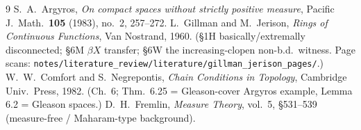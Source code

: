 \documentclass[11pt]{article}
\theoremstyle{definition}
\theoremstyle{remark}
\begin{document}
\begin{thebibliography}{9}
 S.~A.~Argyros, \emph{On compact spaces without strictly
  positive measure}, Pacific J.\ Math.\ \textbf{105} (1983), no.~2, 257--272.
 L.~Gillman and M.~Jerison, \emph{Rings of Continuous Functions},
  Van Nostrand, 1960. (\S1H basically/extremally disconnected; \S6M $\beta X$
  transfer; \S6W the increasing-clopen non-b.d.\ witness. Page scans:
  \texttt{notes/literature\_review/literature/gillman\_jerison\_pages/}.)
 W.~W.~Comfort and S.~Negrepontis, \emph{Chain Conditions in
  Topology}, Cambridge Univ.\ Press, 1982. (Ch.~6; Thm.~6.25 = Gleason-cover
  Argyros example, Lemma 6.2 = Gleason spaces.)
 D.~H.~Fremlin, \emph{Measure Theory}, vol.~5, \S531--539
  (measure-free / Maharam-type background).
\end{thebibliography}
\end{document}
